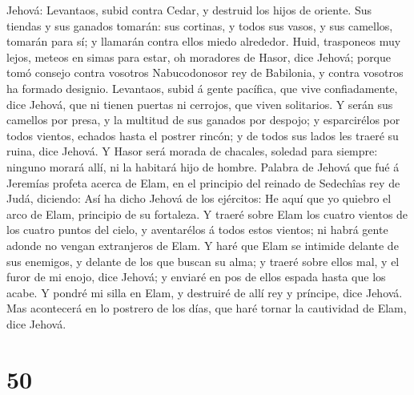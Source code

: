 Jehová: Levantaos, subid contra Cedar, y destruid los hijos de oriente.
 Sus tiendas y sus ganados tomarán: sus cortinas, y todos
sus vasos, y sus camellos, tomarán para sí; y llamarán contra ellos
miedo alrededor.  Huid, trasponeos muy lejos, meteos en
simas para estar, oh moradores de Hasor, dice Jehová; porque tomó
consejo contra vosotros Nabucodonosor rey de Babilonia, y contra
vosotros ha formado designio.  Levantaos, subid á gente
pacífica, que vive confiadamente, dice Jehová, que ni tienen puertas ni
cerrojos, que viven solitarios.  Y serán sus camellos por
presa, y la multitud de sus ganados por despojo; y esparcirélos por
todos vientos, echados hasta el postrer rincón; y de todos sus lados les
traeré su ruina, dice Jehová.  Y Hasor será morada de
chacales, soledad para siempre: ninguno morará allí, ni la habitará hijo
de hombre.  Palabra de Jehová que fué á Jeremías profeta
acerca de Elam, en el principio del reinado de Sedechîas rey de Judá,
diciendo:  Así ha dicho Jehová de los ejércitos: He aquí
que yo quiebro el arco de Elam, principio de su fortaleza. 
Y traeré sobre Elam los cuatro vientos de los cuatro puntos del cielo, y
aventarélos á todos estos vientos; ni habrá gente adonde no vengan
extranjeros de Elam.  Y haré que Elam se intimide delante
de sus enemigos, y delante de los que buscan su alma; y traeré sobre
ellos mal, y el furor de mi enojo, dice Jehová; y enviaré en pos de
ellos espada hasta que los acabe.  Y pondré mi silla en
Elam, y destruiré de allí rey y príncipe, dice Jehová.  Mas
acontecerá en lo postrero de los días, que haré tornar la cautividad de
Elam, dice Jehová.

\hypertarget{section-49}{%
\section{50}\label{section-49}}

